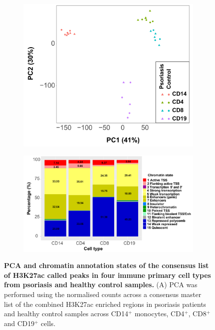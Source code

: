 \begin{figure}[htbp]
\centering
\begin{subfigure}{0.65\textwidth}
\centering
\includegraphics[width=\textwidth]{./Results2/pdfs/ChIPm_H3K27ac_all_cell_types_filtered_PCA}
\caption{\textbf{}}
\end{subfigure}
\begin{subfigure}{0.7\textwidth}
\centering
\includegraphics[width=\textwidth]{./Results2/pdfs/ChIPm_H3K27ac_cell_type_specific_master_list_chromatin_states_annotated_filtered}
\caption{\textbf{}}
\end{subfigure}
\caption[PCA and chromatin annotation states of the consensus list of H3K27ac called peaks in four immune primary cell types from psoriasis and healthy control samples.]{\textbf{PCA and chromatin annotation states of the consensus list of H3K27ac called peaks in four immune primary cell types from psoriasis and healthy control samples.} (A) PCA was performed using the normalised counts across a consensus master list of the combined H3K27ac enriched regions in psoriasis patients and healthy control samples across CD14$^+$ monocytes, CD4$^+$, CD8$^+$ and CD19$^+$ cells. %
}
\end{figure}
